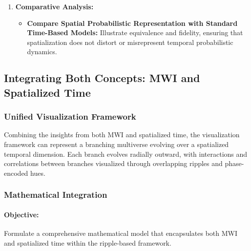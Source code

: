 \documentclass[12pt]{article}
\begin{document}
\begin{enumerate}
    \item \textbf{Comparative Analysis:}
    \begin{itemize}
        \item \textbf{Compare Spatial Probabilistic Representation with Standard Time-Based Models:}
        Illustrate equivalence and fidelity, ensuring that spatialization does not distort or misrepresent temporal probabilistic dynamics.
    \end{itemize}
\end{enumerate}

\subsection{Integrating Both Concepts: MWI and Spatialized Time}
\subsubsection{Unified Visualization Framework}
Combining the insights from both MWI and spatialized time, the visualization framework can represent a branching multiverse evolving over a spatialized temporal dimension. Each branch evolves radially outward, with interactions and correlations between branches visualized through overlapping ripples and phase-encoded hues.

\subsubsection{Mathematical Integration}
\paragraph{Objective:} Formulate a comprehensive mathematical model that encapsulates both MWI and spatialized time within the ripple-based framework.
\end{document}
